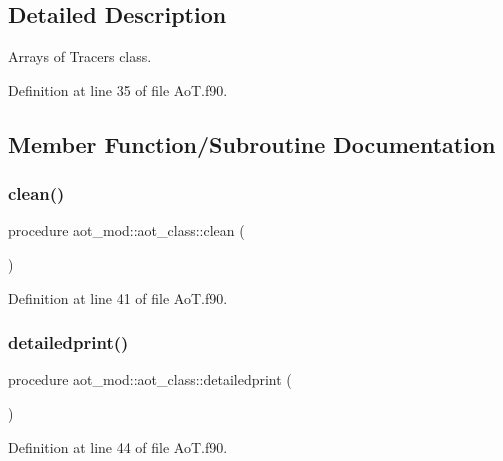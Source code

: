 \subsection{Detailed Description}
Arrays of Tracers class. 

Definition at line 35 of file Ao\+T.\+f90.



\subsection{Member Function/\+Subroutine Documentation}
\mbox{\label{structaot__mod_1_1aot__class_aab1eb00e5cd2868ff08fcd5bb1529688}} 
\subsubsection{\texorpdfstring{clean()}{clean()}}
{\footnotesize\ttfamily procedure aot\+\_\+mod\+::aot\+\_\+class\+::clean (\begin{DoxyParamCaption}{ }\end{DoxyParamCaption})\hspace{0.3cm}{\ttfamily [private]}}



Definition at line 41 of file Ao\+T.\+f90.

\mbox{\label{structaot__mod_1_1aot__class_a9e102da285babd08bff501efbe3b3b10}} 
\subsubsection{\texorpdfstring{detailedprint()}{detailedprint()}}
{\footnotesize\ttfamily procedure aot\+\_\+mod\+::aot\+\_\+class\+::detailedprint (\begin{DoxyParamCaption}{ }\end{DoxyParamCaption})\hspace{0.3cm}{\ttfamily [private]}}



Definition at line 44 of file Ao\+T.\+f90.

